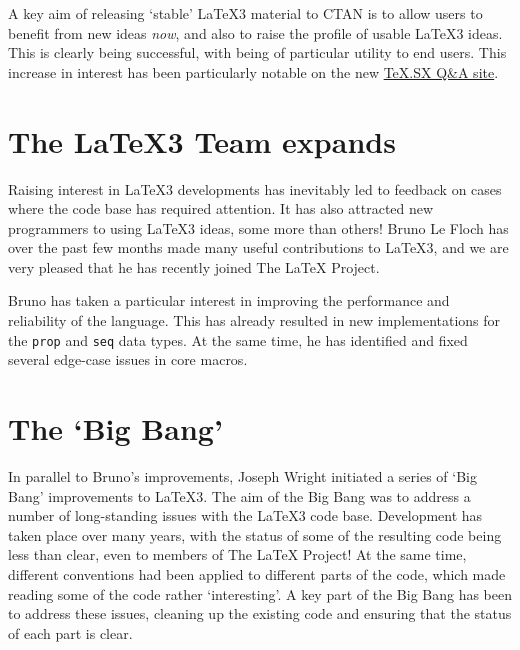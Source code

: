 \documentclass{ltnews}
\begin{document}
\maketitle

\noindent
A key aim of releasing `stable' \LaTeX3 material to CTAN is to allow users to
benefit from new ideas \emph{now}, and also to raise the profile of usable
\LaTeX3 ideas. This is clearly being successful, with  being of
particular utility to end users. This increase in interest has been
particularly notable on the new
\href{http://tex.stackexchange.com/}{TeX.SX Q\&A site}.

\section{The \LaTeX3 Team expands}

Raising interest in \LaTeX3 developments has inevitably led to feedback on
cases where the code base has required attention. It has also attracted new
programmers to using \LaTeX3 ideas, some more than others! Bruno Le Floch has
over the past few months made many useful contributions to \LaTeX3, and we are
very pleased that he has recently joined The LaTeX{} Project.

Bruno has taken a particular interest in improving the performance and
reliability of the  language. This has already resulted in new
implementations for the \texttt{prop} and \texttt{seq} data types. At the same
time, he has identified and fixed several edge-case issues in core 
macros.

\section{The `Big Bang'}

In parallel to Bruno's improvements, Joseph Wright initiated a series of `Big
Bang' improvements to \LaTeX3. The aim of the Big Bang was to address a number
of long-standing issues with the \LaTeX3 code base. Development has taken place
over many years, with the status of some of the resulting code being less
than clear, even to members of The LaTeX{} Project! At the same time, different
conventions had been applied to different parts of the code, which made reading
some of the code rather `interesting'. A key part of the Big Bang has been to
address these issues, cleaning up the existing code and ensuring that the
status of each part is clear.
\end{document}
